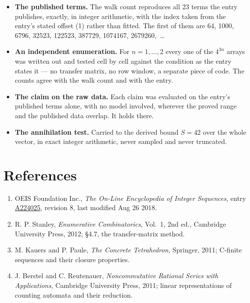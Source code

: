 \documentclass[11pt]{article}
\theoremstyle{definition}
\begin{document}
\begin{itemize}

\item {\bfseries The published terms.} The walk count reproduces all 23 terms the entry publishes, exactly, in integer arithmetic, with the index taken from the entry's stated offset (1) rather than fitted. The first of them are 64, 1000, 6796, 32523, 122523, 387729, 1074167, 2679260,~\dots

\item {\bfseries An independent enumeration.} For $n = 1,\dots,2$ every one of the $4^{3n}$ arrays was written out and tested cell by cell against the condition as the entry states it --- no transfer matrix, no row window, a separate piece of code. The counts agree with the walk count and with the entry.

\item {\bfseries The claim on the raw data.} Each claim was evaluated on the entry's published terms alone, with no model involved, wherever the proved range and the published data overlap. It holds there.

\item {\bfseries The annihilation test.} Carried to the derived bound $S = 42$ over the whole vector, in exact integer arithmetic, never sampled and never truncated.

\end{itemize}

\section{References}

\begin{enumerate}

\item OEIS Foundation Inc., \emph{The On-Line Encyclopedia of Integer Sequences}, entry \href{https://oeis.org/A224025}{A224025}, revision 8, last modified Aug 26 2018.

\item R. P. Stanley, \emph{Enumerative Combinatorics}, Vol.~1, 2nd ed., Cambridge University Press, 2012; \S4.7, the transfer-matrix method.

\item M. Kauers and P. Paule, \emph{The Concrete Tetrahedron}, Springer, 2011; C-finite sequences and their closure properties.

\item J. Berstel and C. Reutenauer, \emph{Noncommutative Rational Series with Applications}, Cambridge University Press, 2011; linear representations of counting automata and their reduction.

\end{enumerate}
\end{document}
